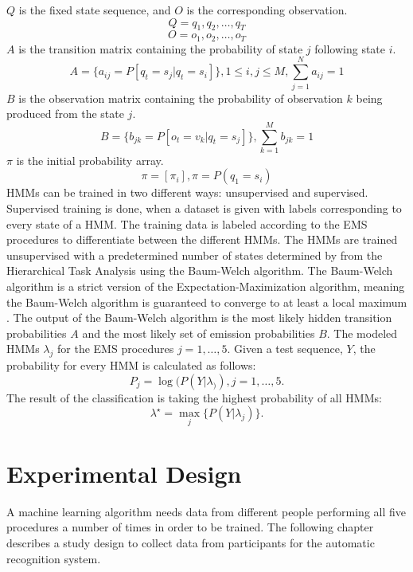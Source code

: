 $Q$ is the fixed state sequence, and $O$ is the corresponding observation.
$$Q=q_1,q_2,\dots,q_T$$
$$O=o_1,o_2,\dots,o_T$$
$A$ is the transition matrix containing the probability of state $j$ following state $i$.
$$A = \{a_{ij} = P[q_t=s_j|q_t=s_i]\}, 1\leq i, j\leq M, \sum_{j=1}^{N}a_{ij}=1$$
$B$ is the observation matrix containing the probability of observation $k$ being produced from the state $j$.
$$B= \{b_{jk}=P[o_t=v_k|q_t=s_j]\}, \sum_{k=1}^{M}b_{jk}=1$$
$\pi$ is the initial probability array.
$$\pi=[\pi_i],\pi=P(q_1=s_i)$$
HMMs can be trained in two different ways: unsupervised and supervised. Supervised training is done, when a dataset is given with labels corresponding to every state of a HMM. The training data is labeled according to the EMS procedures to differentiate between the different HMMs. The HMMs are trained unsupervised with a predetermined number of states determined by from the Hierarchical Task Analysis using the Baum-Welch algorithm. The Baum-Welch algorithm is a strict version of the Expectation-Maximization algorithm, meaning the Baum-Welch algorithm is guaranteed to converge to at least a local maximum \cite{baum1970}. The output of the Baum-Welch algorithm is the most likely hidden transition probabilities $A$ and the most likely set of emission probabilities $B$. The modeled HMMs $\lambda_{j}$ for the EMS procedures $j=1,\dots,5$. Given a test sequence, $Y$, the probability for every HMM is calculated as follows:
$$P_j=\log(P(Y|\lambda_)), j=1,\dots,5.$$
The result of the classification is taking the highest probability of all HMMs:
$$\lambda^\star=\max_{j}\{P(Y|\lambda_{j})\}.$$

\section{Experimental Design}
\label{sec:Experimental-Design}
A machine learning algorithm needs data from different people performing all five procedures a number of times in order to be trained. The following chapter describes a study design to collect data from participants for the automatic recognition system. 


